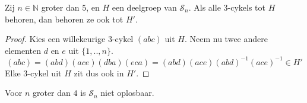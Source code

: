 \documentclass[main.tex]{subfiles}
\begin{document}
\begin{lem}
  Zij $n\in \mathbb{N}$ groter dan $5$, en $H$ een deelgroep van $\mathcal{S}_{n}$.
  Als alle $3$-cykels tot $H$ behoren, dan behoren ze ook tot $H'$.

  \begin{proof}
    Kies een willekeurige $3$-cykel $(abc)$ uit $H$.
    Neem nu twee andere elementen $d$ en $e$ uit $\{1,..,n\}$.
    \[ (abc) = (abd)(ace)(dba)(eca) = (abd)(ace)(abd)^{-1}(ace)^{-1} \in H' \]
    Elke $3$-cykel uit $H$ zit dus ook in $H'$.
  \end{proof}
\end{lem}

\begin{st}
  Voor $n$ groter dan $4$ is $\mathcal{S}_{n}$ niet oplosbaar.
\end{st}
\end{document}
